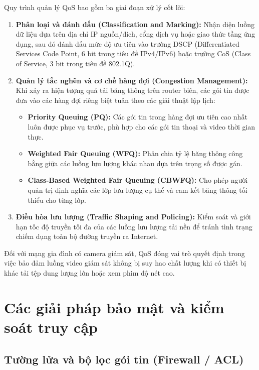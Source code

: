 Quy trình quản lý QoS bao gồm ba giai đoạn xử lý cốt lõi:
\begin{enumerate}
    \item \textbf{Phân loại và đánh dấu (Classification and Marking):} Nhận diện luồng dữ liệu dựa trên địa chỉ IP nguồn/đích, cổng dịch vụ hoặc giao thức tầng ứng dụng, sau đó đánh dấu mức độ ưu tiên vào trường DSCP (Differentiated Services Code Point, 6 bit trong tiêu đề IPv4/IPv6) hoặc trường CoS (Class of Service, 3 bit trong tiêu đề 802.1Q).
    \item \textbf{Quản lý tắc nghẽn và cơ chế hàng đợi (Congestion Management):} Khi xảy ra hiện tượng quá tải băng thông trên router biên, các gói tin được đưa vào các hàng đợi riêng biệt tuân theo các giải thuật lập lịch:
    \begin{itemize}
        \item \textbf{Priority Queuing (PQ):} Các gói tin trong hàng đợi ưu tiên cao nhất luôn được phục vụ trước, phù hợp cho các gói tin thoại và video thời gian thực.
        \item \textbf{Weighted Fair Queuing (WFQ):} Phân chia tỷ lệ băng thông công bằng giữa các luồng lưu lượng khác nhau dựa trên trọng số được gán.
        \item \textbf{Class-Based Weighted Fair Queuing (CBWFQ):} Cho phép người quản trị định nghĩa các lớp lưu lượng cụ thể và cam kết băng thông tối thiểu cho từng lớp.
    \end{itemize}
    \item \textbf{Điều hòa lưu lượng (Traffic Shaping and Policing):} Kiểm soát và giới hạn tốc độ truyền tối đa của các luồng lưu lượng tải nền để tránh tình trạng chiếm dụng toàn bộ đường truyền ra Internet.
\end{enumerate}

Đối với mạng gia đình có camera giám sát, QoS đóng vai trò quyết định trong việc bảo đảm luồng video giám sát không bị suy hao chất lượng khi có thiết bị khác tải tệp dung lượng lớn hoặc xem phim độ nét cao.

\section{Các giải pháp bảo mật và kiểm soát truy cập}
\label{sec:giai-phap-bao-mat-kiem-soat}

\subsection{Tường lửa và bộ lọc gói tin (Firewall / ACL)}
\label{subsec:tuong-lua-va-acl}

